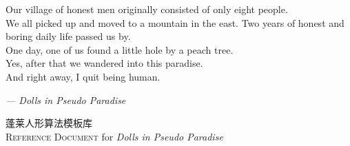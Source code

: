 \documentclass[10pt]{ctexart}
\def\team{Dolls in Pseudo Paradise}
\begin{document}
\begin{titlepage}
    \thispagestyle{empty}

    \vspace*{-1cm}

    \hfill
    \parbox{0.5\textwidth}{
        \epigraph{
            \textsf {Our village of honest men originally consisted of only eight people.} \\
            \textsf {We all picked up and moved to a mountain in the east. Two years of honest and boring daily life passed us by.} \\
            \textsf {One day, one of us found a little hole by a peach tree.} \\
            \textsf {Yes, after that we wandered into this paradise.} \\
            \textsf {And right away, I quit being human.}
        }{\textit{--- Dolls in Pseudo Paradise}}
    }
    \hspace{0.5cm}

    \vfill
    
    \begin{center}
        \Huge {\jinwen 蓬莱人形}算法模板库 \\
        \huge {\textsc{Reference Document} for \textsl{\team}}
    \end{center}

    \vspace*{2cm}


\end{titlepage}
\end{document}
